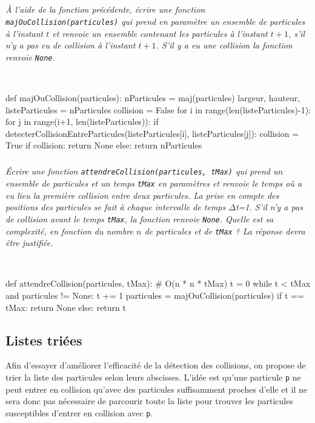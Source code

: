 \documentclass[10pt,fleqn]{article} %
\begin{document}
\subparagraph{}
\textit{À l'aide de la fonction précédente, écrire une fonction \texttt{majOuCollision(particules)} qui prend en paramètre un ensemble de particules à l'instant $t$ et renvoie un ensemble contenant les particules à l'instant $t+1$, s'il n'y a pas eu de collision à l'instant $t+1$. S'il y a eu une collision la fonction renvoie \texttt{None}.}
\ifprof
\begin{corrige}~\\
\begin{python}
def majOuCollision(particules):
    nParticules = maj(particules)
    largeur, hauteur, listeParticules = nParticules
    collision = False    
    for i in range(len(listeParticules)-1):
        for j in range(i+1, len(listeParticules)):
            if detecterCollisionEntreParticules(listeParticules[i], listeParticules[j]):
                collision = True
    if collision:
        return None
    else:
        return nParticules 
\end{python}
\end{corrige}

\newpage
\else
\fi


\subparagraph{}
\textit{Écrire une fonction \texttt{attendreCollision(particules, tMax)} qui prend un ensemble de particules et un temps \texttt{tMax} en paramètres et renvoie le temps où a eu lieu la première collision entre
deux particules. La prise en compte des positions des particules se fait à chaque intervalle de temps $\Delta$t=1. S'il n'y a pas de collision avant le temps \texttt{tMax}, la fonction renvoie \texttt{None}. Quelle
est sa complexité, en fonction du nombre $n$ de particules et de \texttt{tMax} ? La réponse devra être
justifiée.}
\ifprof
\begin{corrige}~\\
\begin{python}
def attendreCollision(particules, tMax):
    # O(n * n * tMax)
    t = 0
    while t < tMax and particules != None:
        t += 1
        particules = majOuCollision(particules)
    if t == tMax:
        return None
    else:
        return t
\end{python}
\end{corrige}
\else
\fi


\subsection*{Listes triées}
\ifprof
\else
Afin d'essayer d'améliorer l'efficacité de la détection des collisions, on propose de trier la liste des
particules selon leurs abscisses. L'idée est qu'une particule \texttt{p} ne peut entrer en collision qu'avec
des particules suffisamment proches d'elle et il ne sera donc pas nécessaire de parcourir toute
la liste pour trouver les particules susceptibles d'entrer en collision avec \texttt{p}.
\end{document}
